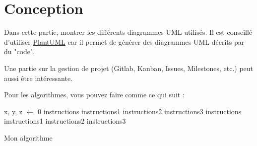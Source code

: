 \chapter{Conception}
Dans cette partie, montrer les différents diagrammes UML utilisés.
Il est conseillé d'utiliser \href{https://plantuml.com/}{PlantUML} car il permet de générer des diagrammes UML décrits par du "code".

Une partie sur la gestion de projet (Gitlab, Kanban, Issues, Milestones, etc.) peut aussi être intéressante.

Pour les algorithmes, vous pouvez faire comme ce qui suit :

\begin{algorithm}[H]
\SetAlgoLined
{}
x, y, z $\leftarrow$ 0\;
{
  instructions\;  
  {
    instructions1\;
    instructions2\;
  }
  {
   instructions3\;
  }
}
{
  instructions\;  
  {
    instructions1\;
    instructions2\;
  }
  {
   instructions3\;
  }
}
\caption{Mon algorithme}
\end{algorithm}
